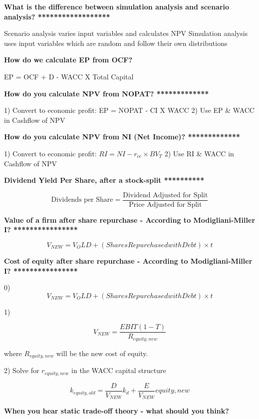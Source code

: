 \documentclass[12pt]{article}
\begin{document}
\begin{framed}
\begin{framed}
		 	\textbf{What is the difference between simulation analysis and scenario analysis? ******************}

			Scenario analysis varies input variables and calculates NPV
			Simulation analysis uses input variables which are random and follow their own distributions
			
			\textbf{How do we calculate EP from OCF?}
			
			EP = OCF + D - WACC X Total Capital
			
			\textbf{How do you calculate NPV from NOPAT? *************}
			
			1) Convert to economic profit: EP = NOPAT - CI X WACC
			2) Use EP \& WACC in Cashflow of NPV 		 	
			
			\textbf{How do you calculate NPV from NI (Net Income)? *************}
			
			1) Convert to economic profit: $RI = NI - r_{ce} \times BV_T$
			2) Use RI \& WACC in Cashflow of NPV 		 	
			
			\begin{framed}
				
				\textbf{Dividend Yield Per Share, after a stock-split **********}
				
				$$
				\text{Dividends per Share} = \dfrac{\text{Dividend Adjusted for Split}}{\text{Price Adjusted for Split}}
				$$
				
					\textbf{Value of a firm after share repurchase - According to Modigliani-Miller I? ****************}
				
				$$
				V_{NEW} = V_OLD + (Shares Repurchased with Debt) \times t
				$$
				
				\textbf{Cost of equity after share repurchase - According to Modigliani-Miller I? ****************}
				
				0) $$
				V_{NEW} = V_OLD + (Shares Repurchased with Debt) \times t
				$$
				
				1) 
				
				$$
				V_{NEW} = \dfrac{EBIT (1 - T)}{R_{equity,new}}
				$$
				
				where $R_{equity,new}$ will be the new cost of equity.
				
				2) Solve for $r_{equity,new}$ in the WACC capital structure
				
				$$
				k_{equity,old} = \dfrac{D}{V_{NEW}} k_d + \dfrac{E}{V_{NEW	}} {equity,new}
				$$
				
			\end{framed}
		 	
		 	\textbf{When you hear static trade-off theory - what should you think?}
		 	

\end{framed}
\end{framed}
\end{document}
